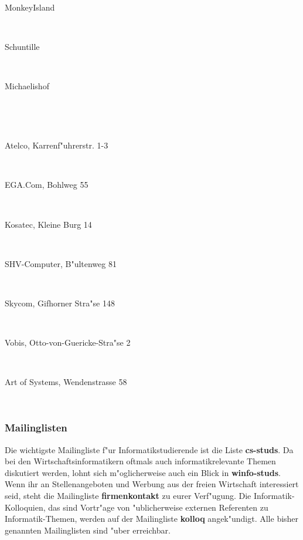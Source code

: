 \begin{description}
 \item[MonkeyIsland]~\\
 \item[Schuntille]~\\
 \item[Michaelishof]~\\
 \item[]~
 \item[Atelco, Karrenf"uhrerstr. 1-3]~\\
 \item[EGA.Com, Bohlweg 55]~\\
 \item[Kosatec, Kleine Burg 14]~\\
 \item[SHV-Computer, B"ultenweg 81]~\\
 \item[Skycom, Gifhorner Stra"se 148]~\\
 \item[Vobis, Otto-von-Guericke-Stra"se 2]~\\
 \item[Art of Systems, Wendenstrasse 58]~\\
 \end{description}

\subsubsection*{Mailinglisten}

Die wichtigste Mailingliste f"ur Informatikstudierende ist die Liste
\textbf{cs-studs}. Da bei den Wirtschaftsinformatikern oftmals auch
informatikrelevante Themen diskutiert werden, lohnt sich m"oglicherweise auch
ein Blick in \textbf{winfo-studs}. Wenn ihr an Stellenangeboten und Werbung aus
der freien Wirtschaft interessiert seid, steht die Mailingliste
\textbf{firmenkontakt} zu eurer Verf"ugung. Die Informatik-Kolloquien, das sind
Vortr"age von "ublicherweise externen Referenten zu Informatik-Themen, werden
auf der Mailingliste \textbf{kolloq} angek"undigt. Alle bisher genannten
Mailinglisten sind "uber 
erreichbar.

